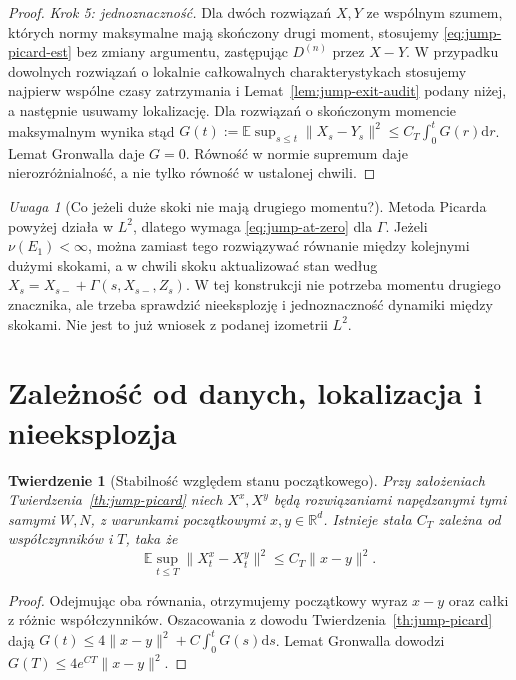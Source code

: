 \documentclass[11pt,a4paper,oneside]{report}
\numberwithin{equation}{chapter}
\theoremstyle{plain}
\newtheorem{twierdzenie}{Twierdzenie}[chapter]
\theoremstyle{definition}
\theoremstyle{remark}
\newtheorem{uwaga}{Uwaga}[chapter]
\newcommand{\R}{\mathbb{R}}
\newcommand{\E}{\mathbb{E}}
\newcommand{\dd}{\mathrm{d}}
\begin{document}
\begin{proof}
\emph{Krok 5: jednoznaczność.} Dla dwóch rozwiązań $X,Y$
ze wspólnym szumem, których normy maksymalne mają skończony
drugi moment, stosujemy \eqref{eq:jump-picard-est}
bez zmiany argumentu, zastępując $D^{(n)}$ przez $X-Y$.
W przypadku dowolnych rozwiązań o lokalnie całkowalnych
charakterystykach stosujemy najpierw wspólne czasy
zatrzymania i Lemat~\ref{lem:jump-exit-audit} podany niżej,
a następnie usuwamy lokalizację. Dla rozwiązań o
skończonym momencie maksymalnym wynika stąd
$G(t):=\E\sup_{s\le t}\|X_s-Y_s\|^2
\le C_T\int_0^tG(r)\dd r$.
Lemat Gronwalla daje $G=0$. Równość w normie supremum
daje nierozróżnialność, a nie tylko równość w ustalonej
chwili.
\end{proof}

\begin{uwaga}[Co jeżeli duże skoki nie mają drugiego momentu?]
Metoda Picarda powyżej działa w $L^2$, dlatego wymaga
\eqref{eq:jump-at-zero} dla $\Gamma$. Jeżeli $\nu(E_1)<\infty$,
można zamiast tego rozwiązywać równanie między kolejnymi dużymi
skokami, a w chwili skoku aktualizować stan według
$X_s=X_{s-}+\Gamma(s,X_{s-},Z_s)$. W tej konstrukcji
nie potrzeba momentu drugiego znacznika, ale trzeba
sprawdzić nieeksplozję i jednoznaczność dynamiki między
skokami. Nie jest to już wniosek z podanej izometrii $L^2$.
\end{uwaga}

\section{Zależność od danych, lokalizacja i nieeksplozja}

\begin{twierdzenie}[Stabilność względem stanu początkowego]
\label{th:jump-stability}
Przy założeniach Twierdzenia~\ref{th:jump-picard} niech
$X^x,X^y$ będą rozwiązaniami napędzanymi tymi samymi
$W,N$, z warunkami początkowymi $x,y\in\R^d$.
Istnieje stała $C_T$ zależna od współczynników i $T$, taka że
\[
 \E\sup_{t\le T}\|X_t^x-X_t^y\|^2\le C_T\|x-y\|^2.
 \tag{13.7}\label{eq:jump-stability}
\]
\end{twierdzenie}
\begin{proof}
Odejmując oba równania, otrzymujemy początkowy wyraz
$x-y$ oraz całki z różnic współczynników. Oszacowania
z dowodu Twierdzenia~\ref{th:jump-picard} dają
$G(t)\le4\|x-y\|^2+C\int_0^tG(s)\dd s$.
Lemat Gronwalla dowodzi $G(T)\le4e^{CT}\|x-y\|^2$.
\end{proof}
\end{document}
